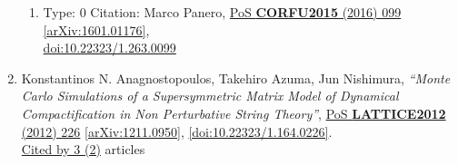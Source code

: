 \documentclass[a4paper,10pt]{article}
\begin{document}
\begin{enumerate}
\begin{enumerate}
  \item Type: 0 Citation: Marco Panero, \href{https://www.doi.org/10.22323/1.263.0099}{PoS {\bf CORFU2015} (2016) 099}  \href{https://arxiv.org/abs/1601.01176}{[arXiv:1601.01176]},\\\href{https://www.doi.org/10.22323/1.263.0099}{doi:10.22323/1.263.0099}
\end{enumerate}
\item Konstantinos N. Anagnostopoulos, Takehiro Azuma, Jun Nishimura, {\it ``Monte Carlo Simulations of a Supersymmetric Matrix Model of Dynamical Compactification in Non Perturbative String Theory''}, \href{https://www.doi.org/10.22323/1.164.0226}{PoS {\bf LATTICE2012} (2012) 226} \href{https://arxiv.org/abs/1211.0950}{[arXiv:1211.0950]}, \href{https://www.doi.org/10.22323/1.164.0226}{[doi:10.22323/1.164.0226]}.
\\\href{https://inspirehep.net/literature/?q=refersto%3Arecid%3A1198171}{Cited by 3 (2)} articles


\end{enumerate}
\end{document}
